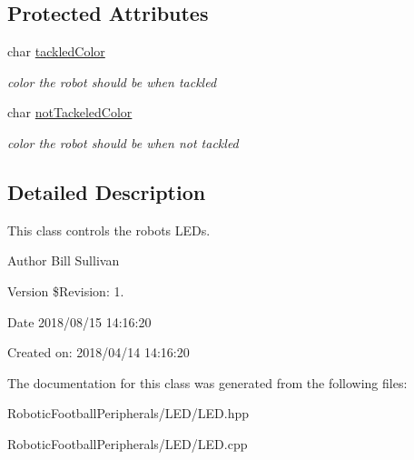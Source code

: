 \subsection*{Protected Attributes}
\begin{DoxyCompactItemize}
\item 
\mbox{\label{class_l_e_d_abdf064808bc54c7ca18456de4f0df0a0}} 
char \mbox{\hyperlink{class_l_e_d_abdf064808bc54c7ca18456de4f0df0a0}{tackled\+Color}}
\begin{DoxyCompactList}\small\item\em color the robot should be when tackled \end{DoxyCompactList}\item 
\mbox{\label{class_l_e_d_acea9ddf3407c6535463a509d04ddfeda}} 
char \mbox{\hyperlink{class_l_e_d_acea9ddf3407c6535463a509d04ddfeda}{not\+Tackeled\+Color}}
\begin{DoxyCompactList}\small\item\em color the robot should be when not tackled \end{DoxyCompactList}\end{DoxyCompactItemize}


\subsection{Detailed Description}
This class controls the robots L\+E\+Ds. 

\begin{DoxyAuthor}{Author}
Bill Sullivan
\end{DoxyAuthor}
\begin{DoxyVersion}{Version}
\$\+Revision\+: 1.
\end{DoxyVersion}
\begin{DoxyDate}{Date}
2018/08/15 14\+:16\+:20
\end{DoxyDate}
Created on\+: 2018/04/14 14\+:16\+:20 

The documentation for this class was generated from the following files\+:\begin{DoxyCompactItemize}
\item 
Robotic\+Football\+Peripherals/\+L\+E\+D/L\+E\+D.\+hpp\item 
Robotic\+Football\+Peripherals/\+L\+E\+D/L\+E\+D.\+cpp\end{DoxyCompactItemize}
